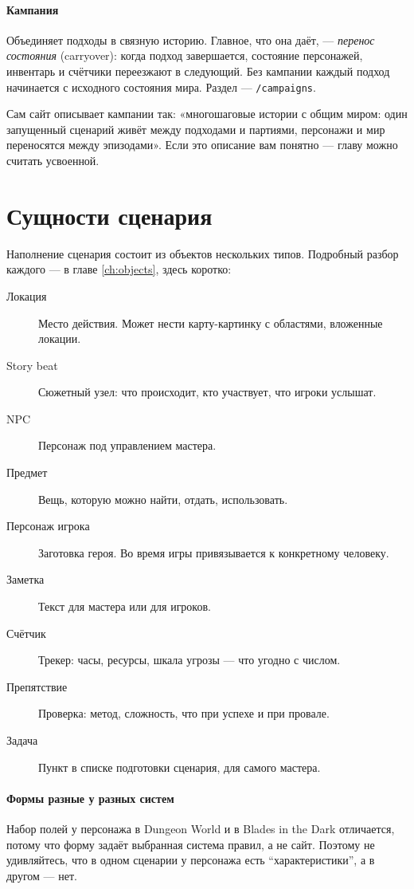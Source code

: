 \paragraph{Кампания}
Объединяет подходы в связную историю. Главное, что она даёт, --- \emph{перенос состояния} (carryover): когда подход завершается, состояние персонажей, инвентарь и счётчики переезжают в следующий. Без кампании каждый подход начинается с исходного состояния мира. Раздел --- \texttt{/campaigns}.


Сам сайт описывает кампании так: «многошаговые истории с общим миром: один запущенный сценарий живёт между подходами и партиями, персонажи и мир переносятся между эпизодами». Если это описание вам понятно --- главу можно считать усвоенной.

\section{Сущности сценария}
\label{sec:concepts:entities}

Наполнение сценария состоит из объектов нескольких типов. Подробный разбор каждого --- в главе \ref{ch:objects}, здесь коротко:

\begin{description}
\item[Локация] Место действия. Может нести карту-картинку с областями, вложенные локации.
\item[Story beat] Сюжетный узел: что происходит, кто участвует, что игроки услышат.
\item[NPC] Персонаж под управлением мастера.
\item[Предмет] Вещь, которую можно найти, отдать, использовать.
\item[Персонаж игрока] Заготовка героя. Во время игры привязывается к конкретному человеку.
\item[Заметка] Текст для мастера или для игроков.
\item[Счётчик] Трекер: часы, ресурсы, шкала угрозы --- что угодно с числом.
\item[Препятствие] Проверка: метод, сложность, что при успехе и при провале.
\item[Задача] Пункт в списке подготовки сценария, для самого мастера.
\end{description}

\paragraph{Формы разные у разных систем}
Набор полей у персонажа в Dungeon World и в Blades in the Dark отличается, потому что форму задаёт выбранная система правил, а не сайт. Поэтому не удивляйтесь, что в одном сценарии у персонажа есть ``характеристики'', а в другом --- нет.

